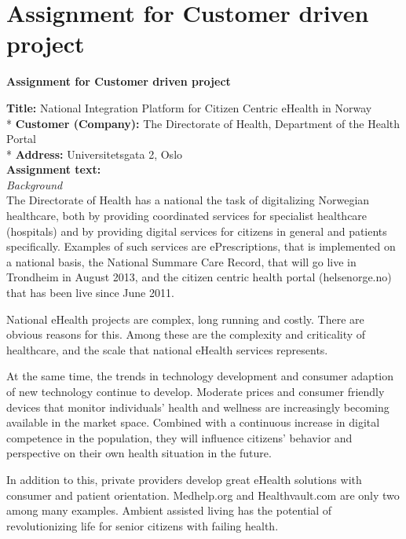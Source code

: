 
\chapter{Assignment for Customer driven project} 

\label{AppendixA}

\textbf{Assignment for Customer driven project}

\textbf{Title:} 	National Integration Platform for Citizen Centric eHealth in Norway \\*
\textbf{Customer (Company):} 	The Directorate of Health, Department of the Health Portal\\*
\textbf{Address:}			Universitetsgata 2, Oslo \\


\textbf{Assignment text:} \\
\textit{Background} \\
The Directorate of Health has a national the task of digitalizing Norwegian healthcare, both by providing coordinated services for specialist healthcare (hospitals) and by providing digital services for citizens in general and patients specifically. 
Examples of such services are ePrescriptions, that is implemented on a national basis, the National Summare Care Record, that will go live in Trondheim in August 2013, and the citizen centric health portal  (helsenorge.no) that has been live since June 2011.

National eHealth projects are complex, long running and costly. There are obvious reasons for this. 
Among these are the complexity and criticality of healthcare, and the scale that national eHealth services represents. 

At the same time, the trends in technology development and consumer adaption of new technology continue to develop. 
Moderate prices and consumer friendly devices that monitor individuals’ health and wellness are increasingly becoming available in the market space. 
Combined with a continuous increase in digital competence in the population, they will influence citizens’ behavior and perspective on their own health situation in the future.

In addition to this, private providers develop great eHealth solutions with consumer and patient orientation. Medhelp.org and Healthvault.com are only two among many examples. 
Ambient assisted living has the potential of revolutionizing life for senior citizens with failing health.

